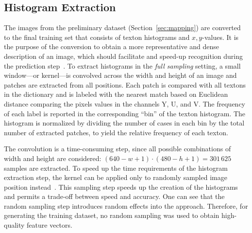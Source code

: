 \documentclass[11pt]{report}
\begin{document}
\subsection{Histogram Extraction}
\label{sec:histogramextract}

The images from the preliminary dataset (Section~\ref{sec:mapping})
are converted to the final training set that consists of texton
histograms and $x,y$-values. It is the purpose of the conversion to
obtain a more representative and dense description of an image, which
should facilitate and speed-up recognition during the prediction
step~\cite{guyon2006introduction}. To extract histograms in the
\emph{full sampling} setting, a small window---or kernel---is
convolved across the width and height of an image and patches are
extracted from all positions. Each patch is compared with all textons
in the dictionary and is labeled with the nearest match based on
Euclidean distance comparing the pixels values in the channels Y, U,
and V. The frequency of each label is reported in the corresponding
``bin'' of the texton histogram. The histogram is normalized by
dividing the number of cases in each bin by the total number of
extracted patches, to yield the relative frequency of each texton.

The convolution is a time-consuming step, since all possible
combinations of width and height are considered:
$(640 - w + 1) \cdot (480 - h + 1) = 301\,625$ samples are
extracted. To speed up the time requirements of the histogram
extraction step, the kernel can be applied only to randomly sampled
image position instead~\cite{de2012sub}. This sampling step speeds up
the creation of the histograms and permits a trade-off between speed
and accuracy.
One can see that the random sampling step introduces random effects
into the approach. Therefore, for generating the training dataset, no
random sampling was used to obtain high-quality feature vectors.

\end{document}
